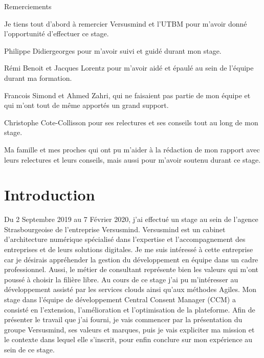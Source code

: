 \documentclass[12pt, a4paper]{report}
\begin{document}
\makeutbmfrontcover{}
\begin{center}
    \Huge{Remerciements}\newline
\end{center}
Je tiens tout d'abord à remercier Versusmind et l'UTBM pour m'avoir donné l'opportunité d'effectuer ce stage.\newline

Philippe Didiergeorges pour m'avoir suivi et guidé durant mon stage.\newline

Rémi Benoit et Jacques Lorentz pour m'avoir aidé et épaulé au sein de l'équipe durant ma formation.\newline

Francois Simond et Ahmed Zahri, qui ne faisaient pas partie de mon équipe et qui m'ont tout de même apportés un grand support.\newline

Christophe Cote-Collisson pour ses relectures et ses conseils tout au long de mon stage.\newline

Ma famille et mes proches qui ont pu m'aider à la rédaction de mon rapport avec leurs relectures et leurs conseils, mais aussi pour m'avoir soutenu durant ce stage.
\newpage
\tableofcontents
\chapter{Introduction}
Du 2 Septembre 2019 au 7 Février 2020, j'ai effectué un stage au sein de l'agence Strasbourgeoise de l'entreprise Versusmind.\newline
Versusmind est un cabinet d'architecture numérique spécialisé dans l'expertise et l'accompagnement des entreprises et de leurs solutions digitales.\newline
Je me suis intéressé à cette entreprise car je désirais appréhender la gestion du développement en équipe dans un cadre professionnel.
Aussi, le métier de consultant représente bien les valeurs qui m'ont poussé à choisir la filière libre.\newline
Au cours de ce stage j'ai pu m'intéresser au développement assisté par les services clouds ainsi qu'aux méthodes Agiles.\newline
Mon stage dans l'équipe de développement Central Consent Manager (CCM) a consisté en l'extension, l'amélioration et l'optimisation de la plateforme.\newline
Afin de présenter le travail que j'ai fourni, je vais commencer par la présentation du groupe Versusmind, ses valeurs et marques, puis je vais expliciter ma mission et le contexte dans lequel elle s'inscrit, pour enfin conclure sur mon expérience au sein de ce stage.
\end{document}
